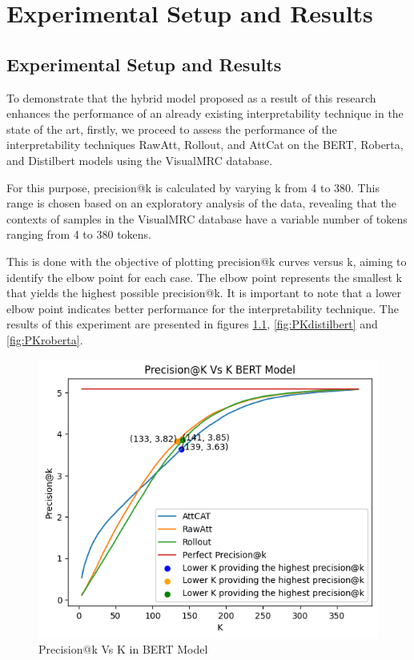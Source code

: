 \chapter{Experimental Setup and Results}\label{ch:chapter_3}

\section{Experimental Setup and Results}

To demonstrate that the hybrid model proposed as a result of this research enhances the performance of an already existing interpretability technique in the state of the art, firstly, we proceed to assess the performance of the interpretability techniques RawAtt, Rollout, and AttCat on the BERT, Roberta, and Distilbert models using the VisualMRC database. 

For this purpose, precision@k is calculated by varying k from 4 to 380. This range is chosen based on an exploratory analysis of the data, revealing that the contexts of samples in the VisualMRC database have a variable number of tokens ranging from 4 to 380 tokens. 

This is done with the objective of plotting precision@k curves versus k, aiming to identify the elbow point for each case. The elbow point represents the smallest k that yields the highest possible precision@k. It is important to note that a lower elbow point indicates better performance for the interpretability technique. The results of this experiment are presented in figures \ref{fig:PKbert}, \ref{fig:PKdistilbert} and \ref{fig:PKroberta}. 

\newpage

\begin{figure}[H]
    \centering%
    \includegraphics[width=0.75\linewidth]{Figures/Experimental Setup/Codo_BERT_VMRC.png}
    \caption{Precision@k Vs K in BERT Model}
    \label{fig:PKbert}
\end{figure}

